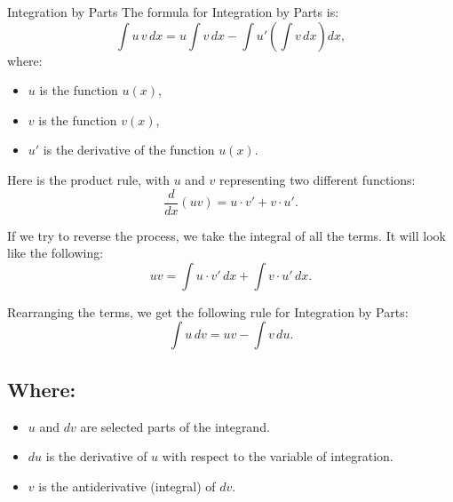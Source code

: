 \documentclass[12pt]{article}
\theoremstyle{beautifulthm}
\begin{document}
\begin{mytheorem}{Integration by Parts}{}
The formula for Integration by Parts is:
\[
\int u \, v \, dx = u \int v \, dx - \int u' \left(\int v \, dx\right) dx,
\]
where:
\begin{itemize}
    \item \( u \) is the function \( u(x) \),
    \item \( v \) is the function \( v(x) \),
    \item \( u' \) is the derivative of the function \( u(x) \).
\end{itemize}
\end{mytheorem}

Here is the product rule, with \( u \) and \( v \) representing two different functions:
\[
\frac{d}{dx}(uv) = u \cdot v' + v \cdot u'.
\]

If we try to reverse the process, we take the integral of all the terms. It will look like the following:
\[
uv = \int u \cdot v' \, dx + \int v \cdot u' \, dx.
\]

Rearranging the terms, we get the following rule for Integration by Parts:
\[
\int u \, dv = uv - \int v \, du.
\]

\subsection*{Where:}
\begin{itemize}
    \item \( u \) and \( dv \) are selected parts of the integrand.
    \item \( du \) is the derivative of \( u \) with respect to the variable of integration.
    \item \( v \) is the antiderivative (integral) of \( dv \).
\end{itemize}
\end{document}
